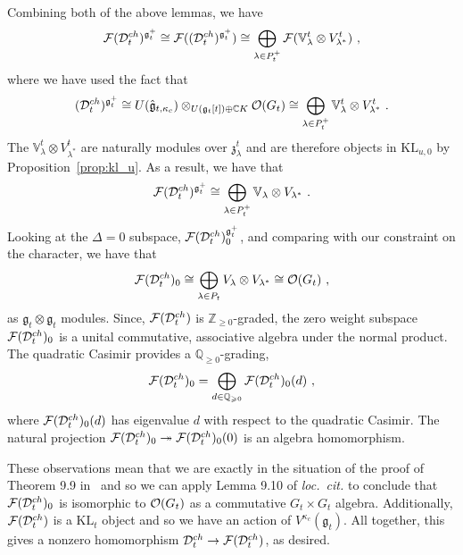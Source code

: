 \documentclass[a4paper]{article}
\def\IC{\mathbb{C}}
\def\IV{\mathbb{V}}
\def\IZ{\mathbb{Z}}
\def\FF{{\cal F}}
\def\OO{{\cal O}}
\def\gf{\mathfrak{g}}
\def \zf{\mathfrak{z}}
\def \KL{\mathrm{KL}}
\def\D{\mathcal{D}^{ch}}
\begin{document}
Combining both of the above lemmas, we have
\begin{equation*}
	\FF(\D_t)^{\gf_t^+} \cong \FF((\D_t)^{\gf_t^+})\cong \bigoplus_{\lambda\in P_t^+}\FF(\IV^t_\lambda\otimes V^t_{\lambda^*})~,
\end{equation*}
where we have used the fact that
\begin{equation*}
	(\D_t)^{\gf_t^+} \cong U(\hat{\gf}_{t,\kappa_c}) \otimes_{U(\gf_t[t])\oplus \IC K} \OO(G_t)\cong \bigoplus_{\lambda\in P_t^+}\IV^t_\lambda\otimes V^t_{\lambda^*}~.
\end{equation*}
The $\IV^t_\lambda\otimes V^t_{\lambda^*}$ are naturally modules over $\zf_\lambda^t$ and are therefore objects in $\KL_{u,0}$ by Proposition~\ref{prop:kl_u}. As a result, we have that
\begin{equation*}
	\FF(\D_t)^{\gf_t^+} \cong \bigoplus_{\lambda\in P_t^+} \IV_{\lambda}\otimes V_{\lambda^*}~.
\end{equation*}
Looking at the $\Delta=0$ subspace, $\FF(\D_t)^{\gf_t^+}_0$, and comparing with our constraint on the character, we have that
\begin{equation*}
	\FF(\D_t)_0 \cong \bigoplus_{\lambda\in P_t} V_{\lambda}\otimes V_{\lambda^*} \cong \OO(G_t)~,
\end{equation*}
as $\gf_t\otimes\gf_t$ modules. Since, $\FF(\D_t)$ is $\IZ_{\geqslant0}$-graded, the zero weight subspace $\FF(\D_t)_0$ is a unital commutative, associative algebra under the normal product. The quadratic Casimir provides a $\mathbb{Q}_{\geqslant0}$-grading,
\begin{equation*}
	\FF(\D_t)_0 = \bigoplus_{d\in \mathbb{Q}_{\geqslant0}} \FF(\D_t)_0(d)~,
\end{equation*}
where $\FF(\D_t)_0(d)$ has eigenvalue $d$ with respect to the quadratic Casimir. The natural projection $\FF(\D_t)_0\twoheadrightarrow \FF(\D_t)_0(0)$ is an algebra homomorphism.

These observations mean that we are exactly in the situation of the proof of Theorem 9.9 in~\cite{Arakawa:2018egx} and so we can apply Lemma 9.10 of \textit{loc.\ cit.} to conclude that $\FF(\D_t)_0$ is isomorphic to $\OO(G_t)$ as a commutative $G_t\times G_t$ algebra. Additionally, $\FF(\D_t)$ is a $\KL_t$ object and so we have an action of $V^{\kappa_c}(\gf_t)$. All together, this gives a nonzero homomorphism $\D_t \rightarrow \FF(\D_t)$, as desired.

\end{document}
